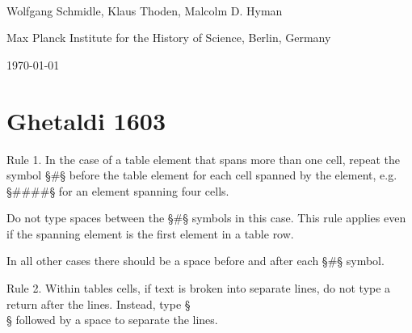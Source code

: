 \documentclass[fontsize=11pt, paper=a4, 
DIV15,
normalheadings,
parskip=half-, 
pointlessnumbers]{scrartcl}
\begin{document}
\begin{center}
{} \\[5mm]
\large Wolfgang Schmidle, Klaus Thoden, Malcolm D. Hyman

\normalsize Max Planck Institute for the History of Science, Berlin, Germany

\today
\end{center}

\section{Ghetaldi 1603}

\begin{mainrule}
Rule 1. In the case of a table element that spans more than one cell, repeat the symbol §#§ before the table element for each cell spanned by the element, e.g. §####§ for an element spanning four cells. 
\end{mainrule}

\begin{clarification}
Do not type spaces between the §#§ symbols in this case. This rule applies even if the spanning element is the first element in a table row.
\end{clarification}

\begin{note}
In all other cases there should be a space before and after each §#§ symbol.
\end{note}

\vspace{3mm}
\begin{mainrule}
Rule 2. Within tables cells, if text is broken into separate lines, do not type a return after the lines. Instead, type §\\§ followed by a space to separate the lines.
\end{mainrule}
\end{document}
